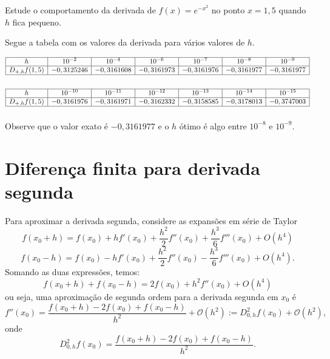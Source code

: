 \begin{exer}Estude o comportamento da derivada de $f(x)=e^{-x^2}$ no ponto $x=1,5$ quando $h$ fica pequeno.
\end{exer}
\begin{resp}
  
Segue a tabela com os valores da derivada para vários valores de $h$.

\begin{equation}
\begin{array}{|c|c|c|c|c|c|c|}\hline
h&10^{-2}&10^{-4}&10^{-6}&10^{-7}&10^{-8}&10^{-9}\\\hline
D_{+,h}f(1,5)& - 0,3125246&- 0,3161608 &- 0,3161973&- 0,3161976&- 0,3161977&- 0,3161977 \\\hline
\multicolumn{7}{c}{}
\end{array}  
\end{equation}  
\begin{equation}
\begin{array}{|c|c|c|c|c|c|c|}\hline
h&10^{-10}&10^{-11}&10^{-12}&10^{-13}&10^{-14}&10^{-15}\\\hline
D_{+,h}f(1,5)&- 0,3161976&- 0,3161971&- 0,3162332&- 0,3158585&- 0,3178013&- 0,3747003\\\hline
\multicolumn{7}{c}{}
\end{array}
\end{equation}
Observe que o valor exato é $-0,3161977$ e o $h$ ótimo é algo entre $10^{-8}$ e $10^{-9}$.        
\end{resp}

\section{Diferença finita para derivada segunda}

Para aproximar a derivada segunda, considere as expansões em série de Taylor
$$
f(x_0+h)=f(x_0)+hf'(x_0)+\frac{h^2}{2}f''(x_0)+\frac{h^3}{6}f'''(x_0)+O(h^4)
$$
$$
f(x_0-h)=f(x_0)-hf'(x_0)+\frac{h^2}{2}f''(x_0)-\frac{h^3}{6}f'''(x_0)+O(h^4).
$$
Somando as duas expressões, temos:
$$
f(x_0+h)+f(x_0-h)=2f(x_0)+h^2f''(x_0)+O(h^4)
$$
ou seja, uma aproximação de segunda ordem para a derivada segunda em $x_0$ é
$$
f''(x_0)=\frac{f(x_0+h)-2f(x_0)+f(x_0-h)}{h^2}+\mathcal{O}(h^2):=D^2_{0,h}f(x_0)+\mathcal{O}(h^2),
$$
onde
$$
D^2_{0,h}f(x_0)=\frac{f(x_0+h)-2f(x_0)+f(x_0-h)}{h^2}.
$$

